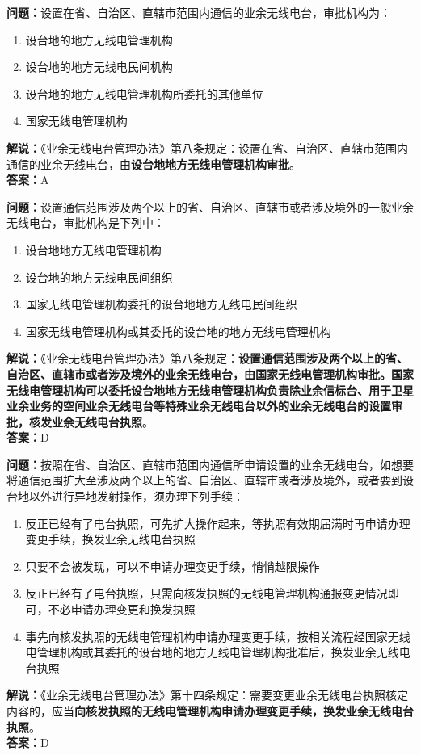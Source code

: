 \documentclass{ctexbook}
\begin{document}
\bigskip


\noindent\textbf{问题：}设置在省、自治区、直辖市范围内通信的业余无线电台，审批机构为：
\begin{enumerate}[label=\Alph*), leftmargin=3em]
	\item 设台地的地方无线电管理机构
	\item 设台地的地方无线电民间机构
	\item 设台地的地方无线电管理机构所委托的其他单位
	\item 国家无线电管理机构
\end{enumerate}
\noindent\textbf{解说：}《业余无线电台管理办法》第八条规定：设置在省、自治区、直辖市范围内通信的业余无线电台，由\textbf{设台地地方无线电管理机构审批}。\\\noindent\textbf{答案：}A


\bigskip


\noindent\textbf{问题：}设置通信范围涉及两个以上的省、自治区、直辖市或者涉及境外的一般业余无线电台，审批机构是下列中：
\begin{enumerate}[label=\Alph*), leftmargin=3em]
	\item 设台地地方无线电管理机构
	\item 设台地的地方无线电民间组织
	\item 国家无线电管理机构委托的设台地地方无线电民间组织
	\item 国家无线电管理机构或其委托的设台地的地方无线电管理机构
\end{enumerate}
\noindent\textbf{解说：}《业余无线电台管理办法》第八条规定：\textbf{设置通信范围涉及两个以上的省、自治区、直辖市或者涉及境外的业余无线电台，由国家无线电管理机构审批。国家无线电管理机构可以委托设台地地方无线电管理机构负责除业余信标台、用于卫星业余业务的空间业余无线电台等特殊业余无线电台以外的业余无线电台的设置审批，核发业余无线电台执照}。\\\noindent\textbf{答案：}D


\bigskip


\noindent\textbf{问题：}按照在省、自治区、直辖市范围内通信所申请设置的业余无线电台，如想要将通信范围扩大至涉及两个以上的省、自治区、直辖市或者涉及境外，或者要到设台地以外进行异地发射操作，须办理下列手续：
\begin{enumerate}[label=\Alph*), leftmargin=3em]
	\item 反正已经有了电台执照，可先扩大操作起来，等执照有效期届满时再申请办理变更手续，换发业余无线电台执照
	\item 只要不会被发现，可以不申请办理变更手续，悄悄越限操作
	\item 反正已经有了电台执照，只需向核发执照的无线电管理机构通报变更情况即可，不必申请办理变更和换发执照
	\item 事先向核发执照的无线电管理机构申请办理变更手续，按相关流程经国家无线电管理机构或其委托的设台地的地方无线电管理机构批准后，换发业余无线电台执照
\end{enumerate}
\noindent\textbf{解说：}《业余无线电台管理办法》第十四条规定：需要变更业余无线电台执照核定内容的，应当\textbf{向核发执照的无线电管理机构申请办理变更手续，换发业余无线电台执照}。\\\noindent\textbf{答案：}D
\end{document}
